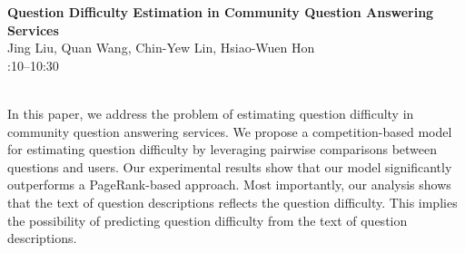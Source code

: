 \documentclass[twoside,makeidx]{book}
\renewcommand{\normalsize}{\fontsize{8}{9}\selectfont}
\renewcommand{\small}{\fontsize{7}{8}\selectfont}
\begin{document}
\par\vspace{2em}\noindent%
\begin{minipage}{\linewidth}%
\begin{center}
\textbf{\normalsize Question Difficulty Estimation in Community Question Answering Services}\\
\normalsize  Jing Liu,  Quan Wang,  Chin-Yew Lin,  Hsiao-Wuen Hon\\
{\small 10:10--10:30}\\
\end{center}
\end{minipage}\\[0.5em]
\nopagebreak%
\noindent%
{\small In this paper, we address the problem of estimating question difficulty in community question answering services. We propose a competition-based model for estimating question difficulty by leveraging pairwise comparisons between questions and users. Our experimental results show that our model significantly outperforms a PageRank-based approach. Most importantly, our analysis shows that the text of question descriptions reflects the question difficulty. This implies the possibility of predicting question difficulty from the text of question descriptions.}
\clearpage
\end{document}
